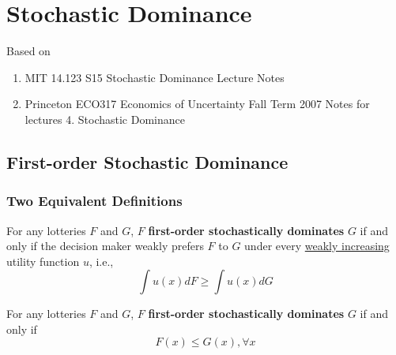 \documentclass[11pt]{elegantbook}
\begin{document}
\chapter{Stochastic Dominance}
Based on
\begin{enumerate}[$\circ$]
    \item MIT 14.123 S15 Stochastic Dominance Lecture Notes
    \item Princeton ECO317 Economics of Uncertainty Fall Term 2007 Notes for lectures 4. Stochastic Dominance
\end{enumerate}

\section{First-order Stochastic Dominance}
\subsection{Two Equivalent Definitions}
\begin{definition}
    \normalfont
    For any lotteries $F$ and $G$, $F$ \textbf{first-order stochastically dominates} $G$ if and only if the decision maker weakly prefers $F$ to $G$ under every \underline{weakly increasing} utility function $u$, i.e.,
    $$\int u (x) dF \geq \int u(x) dG$$
\end{definition}

\begin{definition}
    \normalfont
    For any lotteries $F$ and $G$, $F$ \textbf{first-order stochastically dominates} $G$ if and only if
    $$F(x)\leq G(x),\forall x$$
\end{definition}
\end{document}
